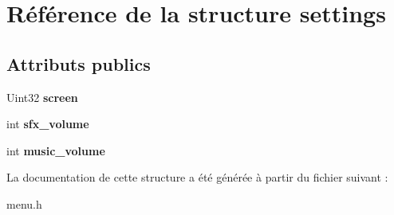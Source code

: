 \hypertarget{structsettings}{}\section{Référence de la structure settings}
\label{structsettings}
\subsection*{Attributs publics}
\begin{DoxyCompactItemize}
\item 
\mbox{\label{structsettings_a3b2a3f5514b31900eb51f1cfcdb35ccc}} 
Uint32 {\bfseries screen}
\item 
\mbox{\label{structsettings_ae7255a055460ef549908f1217e332102}} 
int {\bfseries sfx\+\_\+volume}
\item 
\mbox{\label{structsettings_a4c38da107e921e1b38e95fd05b44cf8c}} 
int {\bfseries music\+\_\+volume}
\end{DoxyCompactItemize}


La documentation de cette structure a été générée à partir du fichier suivant \+:\begin{DoxyCompactItemize}
\item 
menu.\+h\end{DoxyCompactItemize}
